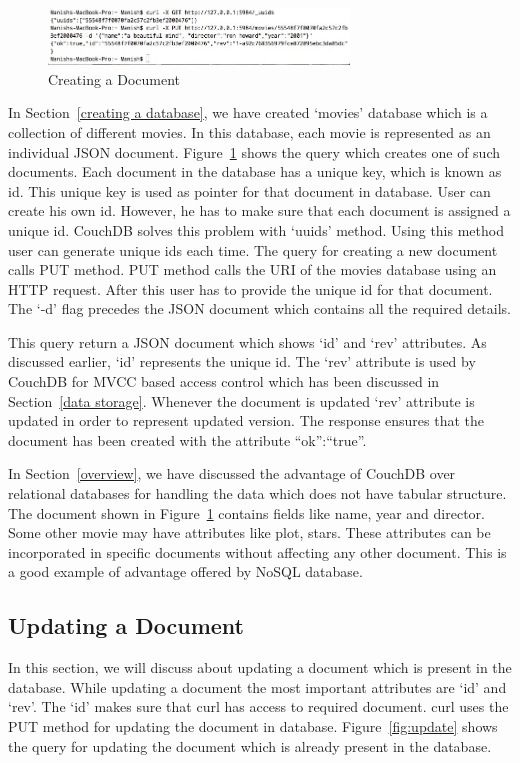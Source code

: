 \documentclass{sig-alternate}
\begin{document}
\begin{figure}
\centering
\includegraphics[width=80mm]{document.jpg}
\caption{Creating a Document \label{fig:document}}
\end{figure}

In Section~\ref{creating a database}, we have created `movies' database which is a collection of different movies. In this database, each movie is represented as an individual JSON document. Figure~\ref{fig:document} shows the query which creates one of such documents. Each document in the database has a unique key, which is known as id. This unique key is used as pointer for that document in database. User can create his own id. However, he has to make sure that each document is assigned a unique id. CouchDB solves this problem with `uuids' method. Using this method user can generate unique ids each time. The query for creating a new document calls PUT method. PUT method calls the URI of the movies database using an HTTP request. After this user has to provide the unique id for that document. The `-d' flag precedes the JSON document which contains all the required details.

This query return a JSON document which shows `id' and `rev' attributes. As discussed earlier, `id' represents the unique id. The `rev' attribute is used by CouchDB for MVCC based access control which has been discussed in Section~\ref{data storage}. Whenever the document is updated `rev' attribute is updated in order to represent updated version. The response ensures that the document has been created with the attribute ``ok'':``true''.

In Section~\ref{overview}, we have discussed the advantage of CouchDB over relational databases for handling the data which does not have tabular structure. The document shown in Figure~\ref{fig:document} contains fields like name, year and director. Some other movie may have attributes like plot, stars. These attributes can be incorporated in specific documents without affecting any other document. This is a good example of advantage offered by NoSQL database.

\subsection{Updating a Document}
\label{current status}
In this section, we will discuss about updating a document which is present in the database. While updating a document the most important attributes are `id' and `rev'. The `id' makes sure that curl has access to required document. curl uses the PUT method for updating the document in database. Figure~\ref{fig:update} shows the query for updating the document which is already present in the database.
\end{document}
